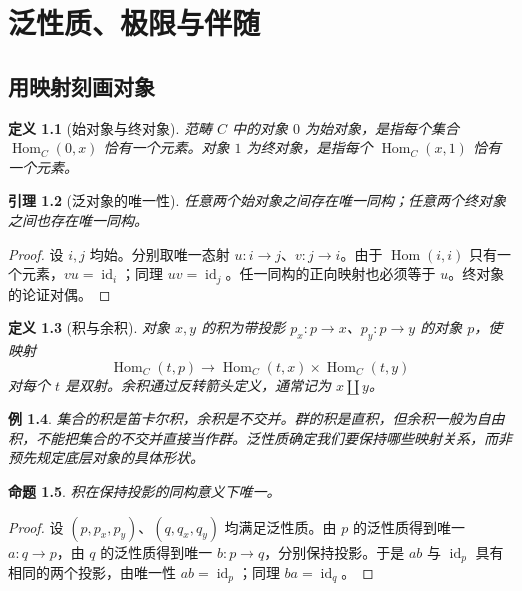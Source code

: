 \documentclass[12pt,oneside,openany,fontset=none]{ctexbook}
\theoremstyle{cn}
\newtheorem{definition}{定义}[chapter]
\newtheorem{example}[definition]{例}
\newtheorem{lemma}[definition]{引理}
\newtheorem{proposition}[definition]{命题}
\numberwithin{equation}{chapter}
\newcommand{\id}{\operatorname{id}}
\newcommand{\Hom}{\operatorname{Hom}}
\begin{document}
\chapter{泛性质、极限与伴随}
\section{用映射刻画对象}
\begin{definition}[始对象与终对象]
范畴 $C$ 中的对象 $0$ 为始对象，是指每个集合 $\Hom_C(0,x)$ 恰有一个元素。对象 $1$ 为终对象，是指每个 $\Hom_C(x,1)$ 恰有一个元素。
\end{definition}
\begin{lemma}[泛对象的唯一性]
任意两个始对象之间存在唯一同构；任意两个终对象之间也存在唯一同构。
\end{lemma}
\begin{proof}
设 $i,j$ 均始。分别取唯一态射 $u:i\to j$、$v:j\to i$。由于 $\Hom(i,i)$ 只有一个元素，$vu=\id_i$；同理 $uv=\id_j$。任一同构的正向映射也必须等于 $u$。终对象的论证对偶。
\end{proof}
\begin{definition}[积与余积]
对象 $x,y$ 的积为带投影 $p_x:p\to x$、$p_y:p\to y$ 的对象 $p$，使映射
\[
\Hom_C(t,p)\longrightarrow\Hom_C(t,x)\times\Hom_C(t,y)
\]
对每个 $t$ 是双射。余积通过反转箭头定义，通常记为 $x\amalg y$。
\end{definition}
\begin{example}
集合的积是笛卡尔积，余积是不交并。群的积是直积，但余积一般为自由积，不能把集合的不交并直接当作群。泛性质确定我们要保持哪些映射关系，而非预先规定底层对象的具体形状。
\end{example}
\begin{proposition}
积在保持投影的同构意义下唯一。
\end{proposition}
\begin{proof}
设 $(p,p_x,p_y)$、$(q,q_x,q_y)$ 均满足泛性质。由 $p$ 的泛性质得到唯一 $a:q\to p$，由 $q$ 的泛性质得到唯一 $b:p\to q$，分别保持投影。于是 $ab$ 与 $\id_p$ 具有相同的两个投影，由唯一性 $ab=\id_p$；同理 $ba=\id_q$。
\end{proof}
\end{document}
